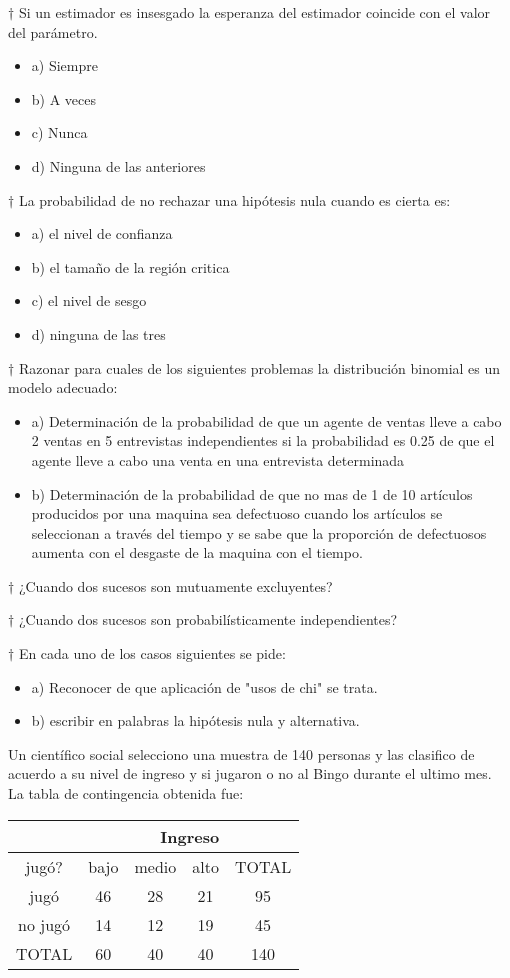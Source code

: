 \documentclass[10pt,a4paper]{article}
\begin{document}
$\dagger$ Si un estimador es insesgado la esperanza del estimador coincide con el valor del parámetro.
\begin{itemize}
	\item a) Siempre
	\item b) A veces
	\item c) Nunca
	\item d) Ninguna de las anteriores 
\end{itemize}

$\dagger$ La probabilidad de no rechazar una hipótesis nula cuando es cierta es:
\begin{itemize}
	\item a) el nivel de confianza
	\item b) el tamaño de la región critica
	\item c) el nivel de sesgo
	\item d) ninguna de las tres
\end{itemize}

$\dagger$ Razonar para cuales de los siguientes problemas la distribución binomial es un modelo adecuado:
\begin{itemize}
	\item a) Determinación de la probabilidad de que un agente de ventas lleve a cabo 2 ventas en 5 entrevistas independientes si la probabilidad es 0.25 de que el agente lleve a cabo una venta en una entrevista determinada
	\item b) Determinación de la probabilidad de que no mas de 1 de 10 artículos producidos por una maquina sea defectuoso cuando los artículos se seleccionan a través del tiempo y se sabe que la proporción de defectuosos aumenta con el desgaste de la maquina con el tiempo.
\end{itemize}

$\dagger$ ¿Cuando dos sucesos son mutuamente excluyentes?

$\dagger$ ¿Cuando dos sucesos son probabilísticamente independientes?

$\dagger$ En cada uno de los casos siguientes se pide:
\begin{itemize}
	\item a) Reconocer de que aplicación de "usos de chi" se trata.
	\item b) escribir en palabras la hipótesis nula y alternativa.
\end{itemize}

Un científico social selecciono una muestra de 140 personas y las clasifico de acuerdo a su nivel de ingreso y si jugaron o no al Bingo durante el ultimo mes. La tabla de contingencia obtenida fue:
\begin{center}
	\begin{tabular}{|c|c|c|c|c|}
		\hline 
		& \multicolumn{4}{c|}{Ingreso} \\ 
		\hline 
		jugó? & bajo & medio & alto & TOTAL \\ 
		\hline 
		jugó & 46 & 28 & 21 & 95 \\ 
		\hline 
		no jugó & 14 & 12 & 19 & 45 \\ 
		\hline 
		TOTAL & 60 & 40 & 40 & 140 \\ 
		\hline 
	\end{tabular} 
\end{center}
\end{document}
